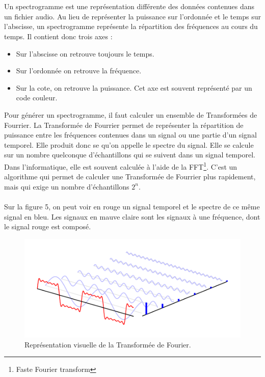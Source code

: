 \documentclass[11pt]{article}
\begin{document}
\\
\\
Un spectrogramme est une représentation différente des données contenues dans un fichier audio.
Au lieu de représenter la puissance sur l'ordonnée et le temps sur l'abscisse, un spectrogramme représente la répartition des fréquences au cours du temps.
Il contient donc trois axes :
\begin{itemize}
    \item Sur l'abscisse on retrouve toujours le temps.
    \item Sur l'ordonnée on retrouve la fréquence.
    \item Sur la cote, on retrouve la puissance. Cet axe est souvent représenté par un code couleur.
\end{itemize}

Pour générer un spectrogramme, il faut calculer un ensemble de Transformées de Fourrier.
La Transformée de Fourrier permet de représenter la répartition de puissance entre les fréquences contenues dans un signal ou une partie d'un signal temporel.
Elle produit donc se qu'on appelle le spectre du signal.
Elle se calcule sur un nombre quelconque d'échantillons qui se suivent dans un signal temporel.
Dans l'informatique, elle est souvent calculée à l'aide de la FFT\footnote{Faste Fourier transform}.
C'est un algorithme qui permet de calculer une Transformée de Fourrier plus rapidement, mais qui exige un nombre d'échantillons $2^{n}$.\\
\\
Sur la figure 5, on peut voir en rouge un signal temporel et le spectre de ce même signal en bleu.
Les signaux en mauve claire sont les signaux à une fréquence, dont le signal rouge est composé.
\begin{figure}[t]
    \begin{center}
        \includegraphics[scale=0.7]{spectre.png}
        \caption{Représentation visuelle de la Transformée de Fourier.}
    \end{center}
\end{figure}
\end{document}
